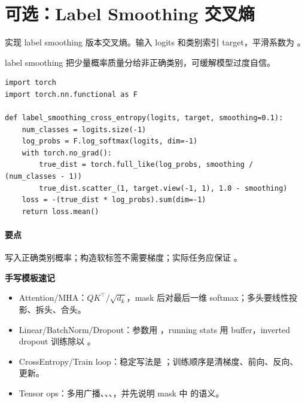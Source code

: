 \section{可选：Label Smoothing 交叉熵}
\begin{interview}
实现 label smoothing 版本交叉熵。输入 logits 和类别索引 target，平滑系数为 。
\end{interview}
\begin{answer}
label smoothing 把少量概率质量分给非正确类别，可缓解模型过度自信。
\begin{lstlisting}
import torch
import torch.nn.functional as F

def label_smoothing_cross_entropy(logits, target, smoothing=0.1):
    num_classes = logits.size(-1)
    log_probs = F.log_softmax(logits, dim=-1)
    with torch.no_grad():
        true_dist = torch.full_like(log_probs, smoothing / (num_classes - 1))
        true_dist.scatter_(1, target.view(-1, 1), 1.0 - smoothing)
    loss = -(true_dist * log_probs).sum(dim=-1)
    return loss.mean()
\end{lstlisting}
\paragraph{要点}  写入正确类别概率；构造软标签不需要梯度；实际任务应保证 。
\end{answer}
\begin{quickcard}
\textbf{手写模板速记}
\begin{itemize}
  \item Attention/MHA：$QK^\top/\sqrt{d_k}$，mask 后对最后一维 softmax；多头要线性投影、拆头、合头。
  \item Linear/BatchNorm/Dropout：参数用 ，running stats 用 buffer，inverted dropout 训练除以 。
  \item CrossEntropy/Train loop：稳定写法是 ；训练顺序是清梯度、前向、反向、更新。
  \item Tensor ops：多用广播、、、，并先说明 mask 中  的语义。
\end{itemize}
\end{quickcard}
